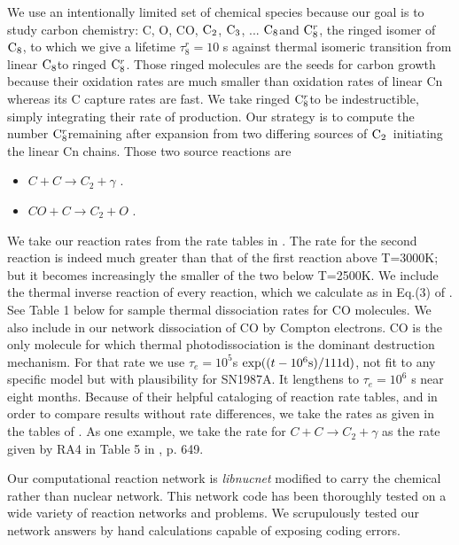 \documentclass[manuscript]{aastex}
\newcommand{\ctwo}{${\rm C}_2$}
\newcommand{\cthree}{${\rm C}_3$}
\newcommand{\ceight}{${\rm C}_8$}
\newcommand{\ceightr}{${\rm C}_8^r$}
\begin{document}
We use an intentionally limited set of chemical species because our goal is
to study carbon chemistry: C, O, CO, \ctwo, \cthree, ... \ceight and
\ceightr, the ringed isomer of \ceight, to which we give a lifetime
$\tau_8^r = 10$ s against thermal isomeric transition
from linear \ceight to ringed \ceightr.
Those ringed molecules are the seeds for carbon
growth because their oxidation rates are much smaller than oxidation rates of
linear Cn whereas its C capture rates are fast. We take ringed \ceightr to be
indestructible, simply integrating their rate of production. Our strategy is
to compute the number \ceightr remaining after expansion from two differing
sources of \ctwo\ initiating the linear Cn chains. Those two source reactions
are
\begin{itemize}
\item $C + C \to C_2 + \gamma$ \citep{1999Sci...283.1290C}.
\item $CO + C \to C_2 + O$  \citep{2009ApJ...703..642C,2010ApJ...713....1C}.
\end{itemize}
We take our reaction rates from the rate tables in
\citet{2009ApJ...703..642C,2010ApJ...713....1C}.
The rate for the second reaction is indeed
much greater than that of the first reaction above T=3000K;
but it becomes increasingly the smaller of the two below T=2500K.
We include the thermal inverse reaction of every reaction,
which we calculate as in Eq.(3) of \citet{2001ApJ...562..480C}.
See Table 1 below for sample thermal dissociation rates for CO molecules.
We also include in our network dissociation of CO by Compton electrons.
CO is the only molecule for which thermal photodissociation is the dominant
destruction mechanism. For that rate we use
$\tau_e = 10^5$s $\exp( (t-10^6{\rm s}) / 111 {\rm d} )$,
not fit to any specific model but with plausibility for SN1987A.
It lengthens to $\tau_e = 10^6$ s near eight months.
Because of their helpful cataloging of reaction rate tables,
and in order to compare results without rate differences, we take the
rates as given in the tables of
\citet{2009ApJ...703..642C,2010ApJ...713....1C}.
As one example, we take the rate for $C + C \to C_2 + \gamma$
as the rate given by RA4 in Table 5 in \citet{2009ApJ...703..642C}, p. 649.

Our computational reaction network is {\em libnucnet}
\citep{2007M&PSA..42.5215M} modified to carry the chemical
rather than nuclear network.  This network code has been thoroughly tested
on a wide variety of reaction networks and problems.
We scrupulously tested our network answers by hand calculations capable of
exposing coding errors.
\end{document}
